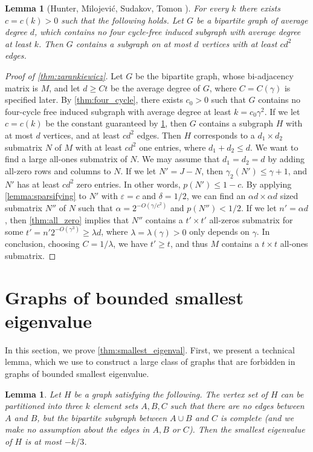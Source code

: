 \documentclass[11pt]{amsart}
\theoremstyle{plain}
\newtheorem{lemma}[theorem]{Lemma}
\theoremstyle{definition}
\begin{document}
\begin{lemma}[Hunter, Milojevi\'c, Sudakov, Tomon \cite{HMST0}]\label{lemma:dense_C4}
For every $k$ there exists $c=c(k)>0$ such that the following holds. Let $G$ be a bipartite graph of average degree $d$, which contains no four cycle-free induced subgraph with average degree at least $k$. Then $G$ contains a subgraph on at most $d$ vertices with at least $cd^2$ edges.
\end{lemma}

\begin{proof}[Proof of \cref{thm:zarankiewicz}]
Let $G$ be the bipartite graph, whose bi-adjacency matrix is $M$, and let $d\geq Ct$ be the average degree of $G$, where $C=C(\gamma)$ is specified later. By \cref{thm:four_cycle}, there exists $c_0>0$ such that $G$ contains no four-cycle free induced subgraph with average degree at least $k=c_0\gamma^2$. If we let $c=c(k)$ be the constant guaranteed by \cref{lemma:dense_C4}, then $G$ contains a subgraph $H$ with at most $d$ vertices, and at least $cd^2$ edges. Then $H$ corresponds to a $d_1\times d_2$ submatrix $N$ of $M$ with at least $cd^2$ one entries, where $d_1+d_2\leq d$. We want to find a large all-ones submatrix of $N$. We may assume that $d_1=d_2=d$ by adding all-zero rows and columns to $N$. If we let $N'=J-N$, then $\gamma_2(N')\leq \gamma+1$, and $N'$ has at least $cd^2$ zero entries. In other words, $p(N')\leq 1-c$. By applying \cref{lemma:sparsifying} to $N'$ with $\varepsilon=c$ and $\delta=1/2$, we can find an $\alpha d\times \alpha d$ sized submatrix $N''$ of $N$ such that $\alpha=2^{-O(\gamma/c^2)}$ and $p(N'')<1/2$. If we let $n'=\alpha d$, then \cref{thm:all_zero} implies that $N''$ contains a $t'\times t'$ all-zeros submatrix for some $t'=n'2^{-O(\gamma^3)}\geq \lambda d$, where $\lambda=\lambda(\gamma)>0$ only depends on $\gamma$. In conclusion, choosing $C=1/\lambda$, we have $t'\geq t$, and thus  $M$ contains a $t\times t$ all-ones submatrix.
\end{proof}

\section{Graphs of bounded smallest eigenvalue}\label{sect:smallest_eig}

In this section, we prove  \cref{thm:smallest_eigenval}. First, we present a technical lemma, which we use to construct a large class of graphs that are forbidden in graphs of bounded smallest eigenvalue.

\begin{lemma}\label{lemma:forbidden_subgraph}
Let $H$ be a graph satisfying the following. The vertex set of $H$ can be partitioned into three $k$ element sets $A,B,C$ such that there are no edges between $A$ and $B$, but the bipartite subgraph between $A\cup B$ and $C$ is complete (and we make no assumption about the edges in $A,B$ or $C$). Then the smallest eigenvalue of $H$ is  at most $-k/3$.
\end{lemma}
\end{document}
